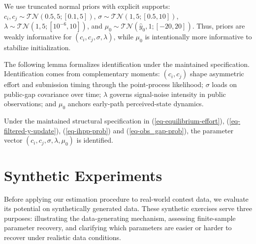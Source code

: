 \documentclass[mnsc]{informs3}
\begin{document}
We use truncated normal priors with explicit supports:
$c_i,c_j\sim\mathcal{TN}(0.5,5;[0.1,5])$,
$\sigma\sim\mathcal{TN}(1,5;[0.5,10])$,
$\lambda\sim\mathcal{TN}(1,5;[10^{-6},10])$,
and $\mu_0\sim\mathcal{TN}(\hat{y}_0,1;[-20,20])$.
Thus, priors are weakly informative for $(c_i,c_j,\sigma,\lambda)$, while $\mu_0$ is intentionally more informative to stabilize initialization.


The following lemma formalizes identification under the maintained specification.
Identification comes from complementary moments: $(c_i,c_j)$ shape asymmetric effort and submission timing through the point-process likelihood; $\sigma$ loads on public-gap covariance over time; $\lambda$ governs signal-noise intensity in public observations; and $\mu_0$ anchors early-path perceived-state dynamics.

\begin{lemma}
\label{lmm-params-identifiability}
Under the maintained structural specification in (\ref{eq-equilibrium-effort}), (\ref{eq-filtered-y-update}), (\ref{eq-ihpp-prob}) and (\ref{eq-obs_gap-prob}), the parameter vector $(c_i,c_j,\sigma,\lambda,\mu_0)$ is identified.
\end{lemma}


\section{Synthetic Experiments}\label{sect-synthetic}

Before applying our estimation procedure to real-world contest data, we evaluate its potential on synthetically generated data.
These synthetic exercises serve three purposes: illustrating the data-generating mechanism, assessing finite-sample parameter recovery, and clarifying which parameters are easier or harder to recover under realistic data conditions.
\end{document}
